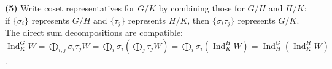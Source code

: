 \documentclass{report}
\begin{document}
\begin{solution}
\textbf{(5)} Write coset representatives for \(G/K\) by combining those for \(G/H\) and \(H/K\): if \(\{\sigma_i\}\) represents \(G/H\) and \(\{\tau_j\}\) represents \(H/K\), then \(\{\sigma_i \tau_j\}\) represents \(G/K\). The direct sum decompositions are compatible: \(\operatorname{Ind}^G_K W = \bigoplus_{i,j} \sigma_i \tau_j W = \bigoplus_i \sigma_i (\bigoplus_j \tau_j W) = \bigoplus_i \sigma_i (\operatorname{Ind}^H_K W) = \operatorname{Ind}^G_H(\operatorname{Ind}^H_K W)\).
\end{solution}
\end{document}
